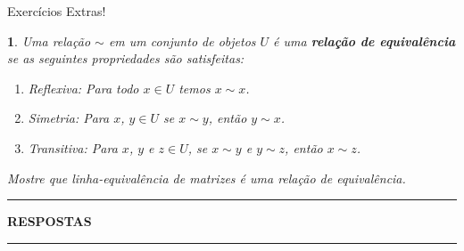 \documentclass[12pt]{exam}
\newtheorem{exercicio}{}
\begin{document}
\begin{center}
  Exercícios Extras!
\end{center}
\begin{exercicio}
  Uma relação $\sim$ em um conjunto de objetos $U$ é uma \textbf{relação de equivalência} se as seguintes propriedades são satisfeitas:
  \begin{enumerate}
    \item \textit{Reflexiva}: Para todo $x \in U$ temos $x \sim x$.
    \item \textit{Simetria}: Para $x$, $y \in U$ se $x \sim y$, então $y \sim x$.
    \item \textit{Transitiva}: Para $x$, $y$ e $z \in U$, se $x \sim y$ e $y \sim z$, então $x \sim z$.
  \end{enumerate}
  Mostre que linha-equivalência de matrizes é uma relação de equivalência.
\end{exercicio}

\newpage
{}
\hrule
\begin{center}
{\large\bf RESPOSTAS}
\end{center}
\hrule

\end{document}
